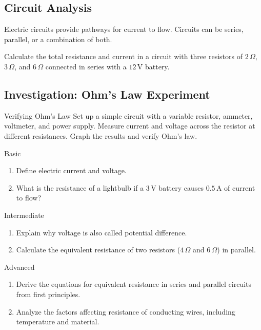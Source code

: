 \subsection{Circuit Analysis}
\FloatBarrier

Electric circuits provide pathways for current to flow. Circuits can be series, parallel, or a combination of both.

\begin{example}
Calculate the total resistance and current in a circuit with three resistors of $2\,\Omega$, $3\,\Omega$, and $6\,\Omega$ connected in series with a $12\,\text{V}$ battery.
\end{example}

\subsection{Investigation: Ohm's Law Experiment}
\FloatBarrier

\begin{investigation}{Verifying Ohm's Law}
Set up a simple circuit with a variable resistor, ammeter, voltmeter, and power supply. Measure current and voltage across the resistor at different resistances. Graph the results and verify Ohm’s law.
\end{investigation}

\begin{tieredquestions}{Basic}
\begin{enumerate}
    \item Define electric current and voltage.
    \item What is the resistance of a lightbulb if a $3\,\text{V}$ battery causes $0.5\,\text{A}$ of current to flow?
\end{enumerate}
\end{tieredquestions}

\begin{tieredquestions}{Intermediate}
\begin{enumerate}
    \item Explain why voltage is also called potential difference.
    \item Calculate the equivalent resistance of two resistors ($4\,\Omega$ and $6\,\Omega$) in parallel.
\end{enumerate}
\end{tieredquestions}

\begin{tieredquestions}{Advanced}
\begin{enumerate}
    \item Derive the equations for equivalent resistance in series and parallel circuits from first principles.
    \item Analyze the factors affecting resistance of conducting wires, including temperature and material.
\end{enumerate}
\end{tieredquestions}

